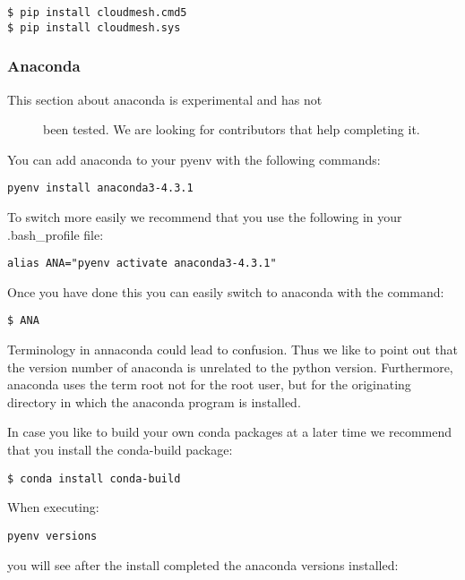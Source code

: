 \begin{verbatim}
$ pip install cloudmesh.cmd5
$ pip install cloudmesh.sys
\end{verbatim}

\subsubsection{Anaconda}\label{anaconda}

\begin{description}
\item[This section about anaconda is experimental and has not]
been tested. We are looking for contributors that help completing it.
\end{description}

You can add anaconda to your pyenv with the following commands:

\begin{verbatim}
pyenv install anaconda3-4.3.1
\end{verbatim}

To switch more easily we recommend that you use the following in your
.bash\_profile file:

\begin{verbatim}
alias ANA="pyenv activate anaconda3-4.3.1"
\end{verbatim}

Once you have done this you can easily switch to anaconda with the
command:

\begin{verbatim}
$ ANA
\end{verbatim}

Terminology in annaconda could lead to confusion. Thus we like to point
out that the version number of anaconda is unrelated to the python
version. Furthermore, anaconda uses the term root not for the root user,
but for the originating directory in which the anaconda program is
installed.

In case you like to build your own conda packages at a later time we
recommend that you install the conda-build package:

\begin{verbatim}
$ conda install conda-build
\end{verbatim}

When executing:

\begin{verbatim}
pyenv versions
\end{verbatim}

you will see after the install completed the anaconda versions
installed:


